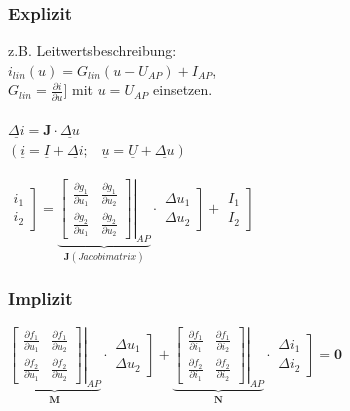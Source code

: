 \documentclass[a4paper,twocolumn,10pt]{article}
\begin{document}
\subsubsection*{Explizit}
z.B. Leitwertsbeschreibung:\\
$i_{lin}(u)=G_{lin}(u-U_{AP})+I_{AP}$,\\
$G_{lin}=\frac{\partial i}{\partial u}]$ mit $u=U_{AP}$ einsetzen.
\\\\
$\underline{\Delta i}=\textbf{J}\cdot \underline{\Delta u}$\\
$(\underline{i}=\underline{I}+\underline{\Delta i};\;\;\;\underline{u}=\underline{U}+\underline{\Delta u})$\\\\
$\left.\begin{matrix}i_1\\ i_2\end{matrix}\right]=\underbrace{\left.\begin{bmatrix}\frac{\partial g_1}{\partial u_1} & \frac{\partial g_1}{\partial u_2}\\ \frac{\partial g_2}{\partial u_1} & \frac{\partial g_2}{\partial u_2}\end{bmatrix}\right|_{AP}}_{\textbf{J} (Jacobimatrix)}\cdot \left.\begin{matrix}\Delta u_1\\ \Delta u_2\end{matrix}\right]+\left.\begin{matrix}I_1\\ I_2\end{matrix}\right]$
\subsubsection*{Implizit}
$\underbrace{\left.\begin{bmatrix}\frac{\partial f_1}{\partial u_1} & \frac{\partial f_1}{\partial u_2}\\ \frac{\partial f_2}{\partial u_1} & \frac{\partial f_2}{\partial u_2}\end{bmatrix}\right|_{AP}}_{\textbf{M}}\cdot \left.\begin{matrix}\Delta u_1\\ \Delta u_2\end{matrix}\right]+ \underbrace{\left.\begin{bmatrix}\frac{\partial f_1}{\partial i_1} & \frac{\partial f_1}{\partial i_2}\\ \frac{\partial f_2}{\partial i_1} & \frac{\partial f_2}{\partial i_2}\end{bmatrix}\right|_{AP}}_{\textbf{N}}\cdot \left.\begin{matrix}\Delta i_1\\ \Delta i_2\end{matrix}\right]=\textbf{0}$
\end{document}
